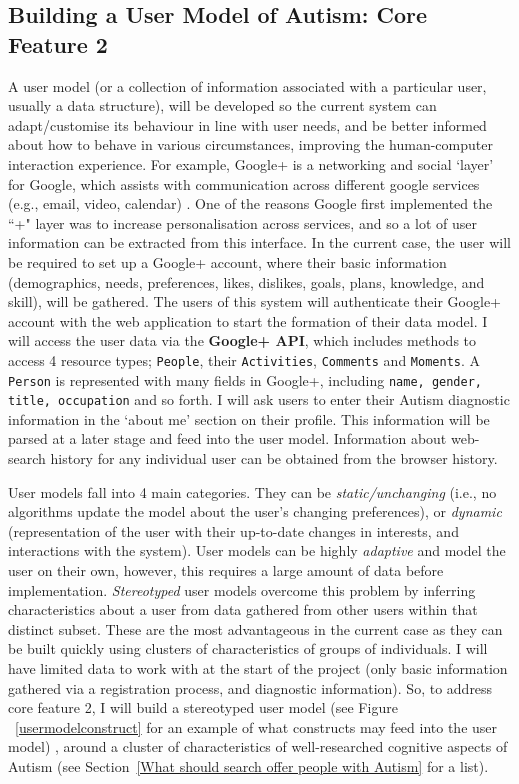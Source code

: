 \documentclass[a4paper, 11pt]{article}
\begin{document}
\begin{justify}
\subsection {Building a User Model of Autism: Core Feature 2}\label{usermodel}
A user model (or a collection of information associated with a particular user, usually a data structure), will be developed so the current system can adapt/customise its behaviour in line with user needs, and be better informed about how to behave in various circumstances, improving the human-computer interaction experience. For example, Google+ is a networking and social `layer' for Google, which assists with communication across different google services (e.g., email, video, calendar) \cite{gplus}. One of the reasons Google first implemented the ``+" layer was to increase personalisation across services, and so a lot of user information can be extracted from this interface. In the current case, the user will be required to set up a Google+ account, where their basic information (demographics, needs, preferences, likes, dislikes, goals, plans, knowledge, and skill), will be gathered.  The users of this system will authenticate their Google+ account with the web application to start the formation of their data model. I will access the user data via the \textbf{Google+ API}, which includes methods to access 4 resource  types; \texttt{People}, their \texttt{Activities}, \texttt{Comments} and \texttt{Moments}. A \texttt{Person} is represented with many fields in Google+, including \texttt{name, gender, title, occupation} and so forth. I will ask users to enter their Autism diagnostic information in the `about me' section on their profile. This information will be parsed at a later stage and feed into the user model. Information about web-search history for any individual user can be obtained from the browser history. 

User models fall into 4 main categories. They can be \textit{static/unchanging} (i.e., no algorithms update the model about the user's changing preferences), or \textit{dynamic} (representation of the user with their up-to-date changes in interests, and interactions with the system). User models can be highly \textit{adaptive} and model the user on their own, however, this requires a large amount of data before implementation. \textit{Stereotyped} user models overcome this problem by inferring characteristics about a user from data gathered from other users within that distinct subset. These are the most advantageous in the current case as they can be built quickly using clusters of characteristics of groups of individuals. I will have limited data to work with at the start of the project (only basic information gathered via a registration process, and diagnostic information). So, to address core feature 2, I will build a stereotyped user model (see Figure ~\ref{usermodelconstruct} for an example of what constructs may feed into the user model) , around a cluster of characteristics of well-researched cognitive aspects of Autism (see Section~\ref{What should search offer people with Autism} for a list).



\end{justify}
\end{document}
